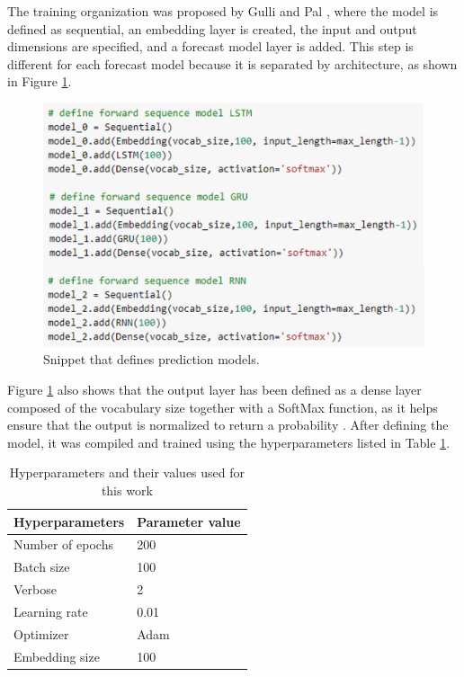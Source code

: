 \documentclass[conference]{IEEEtran}
\begin{document}
The training organization was proposed by Gulli and Pal \cite{b19}, where the model is defined as sequential, an embedding layer is created, the input and output dimensions are specified, and a forecast model layer is added. This step is different for each forecast model because it is separated by architecture, as shown in Figure \ref{fig1}.

\begin{figure}[!ht]
\centerline{\includegraphics[scale=1]{images/Picture1.png}}
\caption{Snippet that defines prediction models.}
\label{fig1}
\end{figure}

Figure \ref{fig1} also shows that the output layer has been defined as a dense layer composed of the vocabulary size together with a SoftMax function, as it helps ensure that the output is normalized to return a probability \cite{b7,b10,b12}. After defining the model, it was compiled and trained using the hyperparameters listed in Table \ref{tab2}.

\begin{table}[htbp]
\caption{Hyperparameters and their values used for this work}
\begin{center}
\begin{tabular}{|l|l|}
\hline
\textbf{Hyperparameters} & \textbf{Parameter value} \\ \hline
Number of epochs         & 200                      \\ \hline
Batch size               & 100                      \\ \hline
Verbose                  & 2                        \\ \hline
Learning rate            & 0.01                     \\ \hline
Optimizer                & Adam                     \\ \hline
Embedding size           & 100                      \\ \hline
\end{tabular}
\label{tab2}
\end{center}
\end{table}
\end{document}
